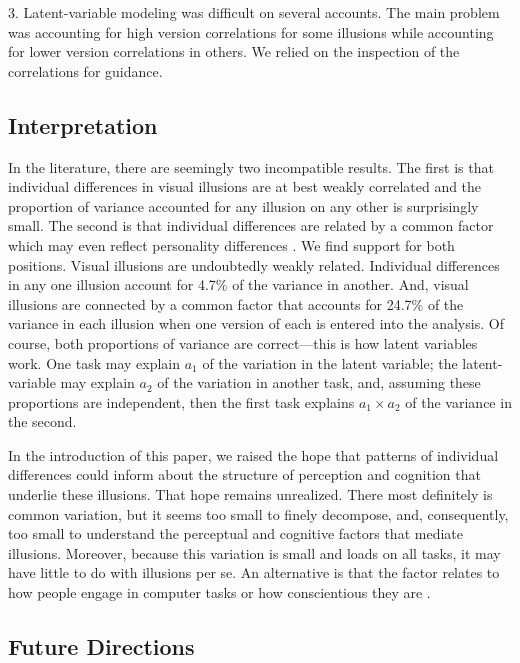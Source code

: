 \documentclass[man, 12pt]{apa7} %
\begin{document}
3. Latent-variable modeling was difficult on several accounts.  The main problem was accounting for high version correlations for some illusions while accounting for lower version correlations in others.  We relied on the inspection of the correlations for guidance.

\subsection{Interpretation}

In the literature, there are seemingly two incompatible results.  The first is that individual differences in visual illusions are at best weakly correlated \parencite{Cretenoud.etal.2019} and the proportion of variance accounted for any illusion on any other is surprisingly small.  The second is that individual differences are related by a common factor which may even reflect personality differences \parencite[]{Makowski.etal.2023}.  We find support for both positions.  Visual illusions are undoubtedly weakly related.   Individual differences in any one illusion account for 4.7\% of the variance in another.   And, visual illusions are connected by a common factor that accounts for 24.7\% of the variance in each illusion when one version of each is entered into the analysis.  Of course, both proportions of variance are correct---this is how latent variables work.  One task may explain $a_1$ of the variation in the latent variable; the latent-variable may explain $a_2$ of the variation in another task, and, assuming these proportions are independent, then the first task explains $a_1\times a_2$ of the variance in the second.

In the introduction of this paper, we raised the hope that patterns of individual differences could inform about the structure of perception and cognition that underlie these illusions.  That hope remains unrealized.  There most definitely is common variation, but it seems too small to finely decompose, and, consequently, too small to understand the perceptual and cognitive factors that mediate illusions.  Moreover, because this variation is small and loads on all tasks, it may have little to do with illusions per se.  An alternative is that the factor relates to how people engage in computer tasks or how conscientious they are \parencite{Makowski.etal.2023}.  


\subsection{Future Directions}
\end{document}

